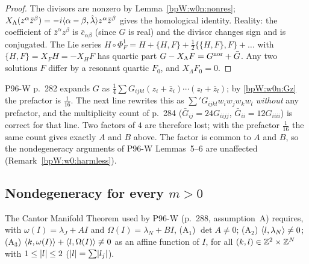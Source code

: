 \begin{proof}
The divisors are nonzero by Lemma~\ref{bpW:w0n:nonres}; $X_\Lambda(z^\alpha\bar z^\beta)=-i\langle \alpha-\beta,\hat\lambda\rangle
z^\alpha\bar z^\beta$ gives the homological identity. Reality: the coefficient of $\bar z^\alpha z^\beta$ is
$\bar c_{\alpha\beta}$ (since $G$ is real) and the divisor changes sign and is conjugated. The Lie series
$H\circ\Phi^1_F=H+\{H,F\}+\frac12\{\{H,F\},F\}+\dots$ with $\{H,F\}=X_FH=-X_HF$ has quartic part
$G-X_\Lambda F=G^{\rm nor}+\bar G$. Any two solutions $F$ differ by a resonant quartic $F_0$, and $X_\Lambda F_0=0$.
\end{proof}

\begin{remark}\label{bpW:w0n:compare}
P96-W p.~282 expands $G$ as $\frac14\sum G_{ijkl}(z_i+\bar z_i)\cdots(z_l+\bar z_l)$; by \eqref{bpW:w0n:Gz} the
prefactor is $\frac1{16}$. The next line rewrites this as $\sum' G_{ijkl}w_iw_jw_kw_l$ \emph{without} any prefactor,
and the multiplicity count of p.~284 ($\bar G_{ij}=24G_{iijj}$, $\bar G_{ii}=12G_{iiii}$) is correct for that line.
Two factors of $4$ are therefore lost; with the prefactor $\frac1{16}$ the same count gives exactly $A$ and $B$ above.
The factor is common to $A$ and $B$, so the nondegeneracy arguments of P96-W Lemmas~5--6 are unaffected
(Remark~\ref{bpW:w0:harmless}).
\end{remark}

\subsection{Nondegeneracy for every \texorpdfstring{$m>0$}{m>0}}\label{bpW:w0n:nondeg-sec}

The Cantor Manifold Theorem used by P96-W (p.~288, assumption~A) requires, with $\omega(I)=\lambda_J+AI$ and
$\Omega(I)=\lambda_N+BI$,
(A$_1$) $\det A\ne0$; (A$_2$) $\langle l,\lambda_N\rangle\ne0$; (A$_3$) $\langle k,\omega(I)\rangle+\langle l,\Omega(I)\rangle\not\equiv0$ as
an affine function of $I$, for all $(k,l)\in\mathbb{Z}^2\times\mathbb{Z}^{N}$ with $1\le\lvert l\rvert\le2$ ($\lvert l\rvert=\sum\lvert l_j\rvert$).

